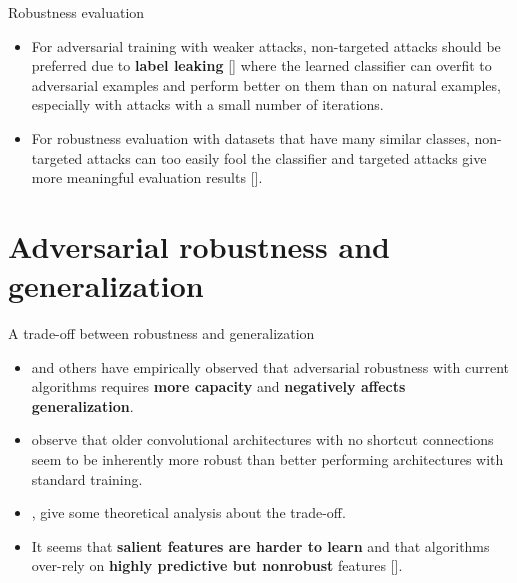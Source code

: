 \documentclass{beamer}
\newcommand{\citet}[1]{{\color{citecolor}\relscale{0.8}\textcite{#1}}}
\newcommand{\citep}[1]{{\color{citecolor}\relscale{0.8}[\textcite{#1}]}}
\begin{document}
\begin{subframe}[allowframebreaks=0.9]{Robustness evaluation}
	\begin{itemize}
		\item For adversarial training with weaker attacks, non-targeted attacks should be preferred due to \textbf{label leaking} \citep{Kurakin:2016:AMLS} where the learned classifier can overfit to adversarial examples and perform better on them than on natural examples, especially with attacks with a small number of iterations. 
		\item For robustness evaluation with datasets that have many similar classes, non-targeted attacks can too easily fool the classifier and targeted attacks give more meaningful evaluation results \citep{Athalye:2018:OGGFSS}.
	\end{itemize}
\end{subframe}

\section{Adversarial robustness and generalization} \label{sec:robustness-generalization}

\begin{frame}[allowframebreaks=0.9]{A trade-off between robustness and generalization}
	\begin{itemize}
		\item \citet{Madry:2017:TDLMRAA,Su:2017:OPAFDNN,Tsipras:2018:RMBOA} and others have empirically observed that adversarial robustness with current algorithms requires \textbf{more capacity} and \textbf{negatively affects generalization}. 
		\item \citet{Su:2017:OPAFDNN} observe that older convolutional architectures with no shortcut connections
		seem to be inherently more robust than better performing architectures
		with standard training.
		\item \citet{Tsipras:2018:RMBOA}, give some theoretical analysis about the trade-off. 
		\item It seems that \textbf{salient features are harder to learn} and that algorithms over-rely on \textbf{highly predictive but nonrobust} features \citep{Tsipras:2018:RMBOA}.
	\end{itemize}
\end{frame}
\end{document}
